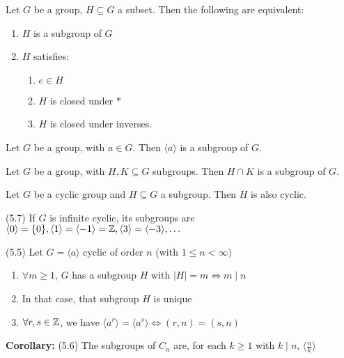 \pagebreak
\thm Let $G$ be a group, $H \subseteq G$ a subset. Then the following are equivalent:
\begin{enumerate}
    \item $H$ is a subgroup of $G$
    \item $H$ satisfies: \begin{enumerate}
        \item $e \in H$
        \item $H$ is closed under $\ast$
        \item $H$ is closed under inverses.
    \end{enumerate}
\end{enumerate}

\thm Let $G$ be a group, with $a \in G$. Then $\langle a \rangle$ is a subgroup of $G$. 

\thm Let $G$ be a group, with $H, K \subseteq G$ subgroups. Then $H \cap K$ is a subgroup of $G$.

\thm Let $G$ be a cyclic group and $H \subseteq G$ a subgroup. Then $H$ is also cyclic.

\thm (5.7) If $G$ is infinite cyclic, its subgroups are $\langle0\rangle = \{0\}, \langle1\rangle = \langle-1\rangle = \mathbb{Z}, \langle3\rangle = \langle-3\rangle, \ldots$

\thm (5.5) Let $G = \langle a \rangle$ cyclic of order $n$ (with $1 \le n < \infty)$
\begin{enumerate}
    \item $\forall m \ge 1$, $G$ has a subgroup $H$ with $|H| = m \Longleftrightarrow m \mid n$
    \item In that case, that subgroup $H$ is unique
    \item $\forall r, s \in \mathbb{Z}$, we have $\langle a^r \rangle = \langle a^s \rangle \Longleftrightarrow (r, n) = (s, n)$
\end{enumerate}

\noindent
\textbf{Corollary:} (5.6) The subgroups of $C_n$ are, for each $k \ge 1$ with $k \mid n$, $\langle \frac{n}{k} \rangle$